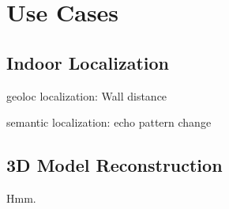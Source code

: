 \section{Use Cases}
\label{sec:usecase}


\subsection{Indoor Localization}

geoloc localization: Wall distance

semantic localization: echo pattern change


\subsection{3D Model Reconstruction}

Hmm.